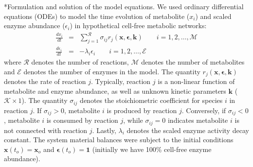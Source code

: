 \documentclass[12pt]{article}
\makeatletter
\renewcommand\subsection{\@startsection
	{subsection}{2}{0mm}
	{-0.05in}
	{-0.5\baselineskip}
	{\normalfont\normalsize\bfseries}}
\makeatother
\begin{document}
\subsection*{Formulation and solution of the model equations.}
We used ordinary differential equations (ODEs) to model the time evolution of metabolite ($x_{i}$) and scaled enzyme abundance ($\epsilon_{i}$) in hypothetical cell-free metabolic networks:
\begin{eqnarray}
	\frac{dx_{i}}{dt} & = & \sum_{j=1}^{\mathcal{R}}\sigma_{ij}r_{j}\left(\mathbf{x},\mathbf{\epsilon},\mathbf{k}\right)\qquad{i=1,2,\hdots,\mathcal{M}}\\
	\frac{d\epsilon_{i}}{dt} & = & -\lambda_{i}\epsilon_{i}\qquad{i=1,2,\hdots,\mathcal{E}}
\end{eqnarray}where $\mathcal{R}$ denotes the number of reactions, $\mathcal{M}$ denotes the number of metabolites and $\mathcal{E}$ denotes the number of enzymes in the model.
The quantity $r_{j}\left(\mathbf{x},\mathbf{\epsilon},\mathbf{k}\right)$ denotes the rate of reaction $j$.
Typically, reaction $j$ is a non-linear function of metabolite and enzyme abundance, as well as unknown kinetic parameters $\mathbf{k}$ ($\mathcal{K}\times{1}$).
The quantity $\sigma_{ij}$ denotes the stoichiometric coefficient for species $i$ in reaction $j$.
If $\sigma_{ij}>0$, metabolite $i$ is produced by reaction $j$.
Conversely, if $\sigma_{ij}<0$, metabolite $i$ is consumed by reaction $j$, while $\sigma_{ij}=0$ indicates metabolite $i$ is not connected with reaction $j$.
Lastly, $\lambda_{i}$ denotes the scaled enzyme activity decay constant.
The system material balances were subject to the initial conditions $\mathbf{x}\left(t_{o}\right)=\mathbf{x}_{o}$ and $\mathbf{\epsilon}\left(t_{o}\right)=\mathbf{1}$ (initially we have 100\% cell-free enzyme abundance).
\end{document}
